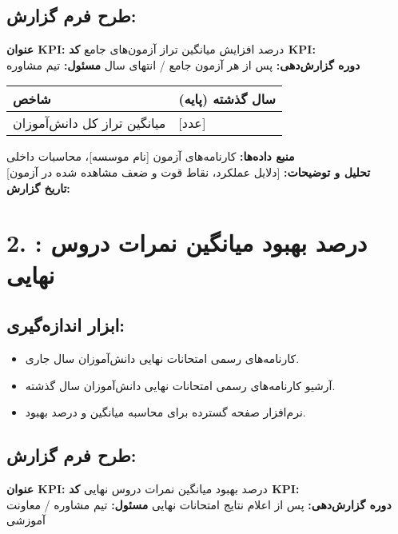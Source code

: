 \documentclass[11pt]{article}
\begin{document}
\subsection*{طرح فرم گزارش:}
\noindent\textbf{عنوان KPI:} درصد افزایش میانگین تراز آزمون‌های جامع \hfill \textbf{کد KPI:}  \\
\noindent\textbf{دوره گزارش‌دهی:} پس از هر آزمون جامع / انتهای سال \hfill \textbf{مسئول:} تیم مشاوره \\

\bigskip
\begin{tabular}{ll}
\textbf{شاخص} & \textbf{سال گذشته (پایه)} \\
\hline
میانگین تراز کل دانش‌آموزان & {[عدد]} \\
\end{tabular}
\bigskip

\noindent\textbf{منبع داده‌ها:} کارنامه‌های آزمون {[نام موسسه]}، محاسبات داخلی \\
\noindent\textbf{تحلیل و توضیحات:} {[دلایل عملکرد، نقاط قوت و ضعف مشاهده شده در آزمون]} \\
\noindent\textbf{تاریخ گزارش:} \\

\hrulefill
\bigskip

\section*{2. : درصد بهبود میانگین نمرات دروس نهایی}

\subsection*{ابزار اندازه‌گیری:}
\begin{itemize}
    \item کارنامه‌های رسمی امتحانات نهایی دانش‌آموزان سال جاری.
    \item آرشیو کارنامه‌های رسمی امتحانات نهایی دانش‌آموزان سال گذشته.
    \item نرم‌افزار صفحه گسترده برای محاسبه میانگین و درصد بهبود.
\end{itemize}

\subsection*{طرح فرم گزارش:}
\noindent\textbf{عنوان KPI:} درصد بهبود میانگین نمرات دروس نهایی \hfill \textbf{کد KPI:}  \\
\noindent\textbf{دوره گزارش‌دهی:} پس از اعلام نتایج امتحانات نهایی \hfill \textbf{مسئول:} تیم مشاوره / معاونت آموزشی \\
\end{document}
